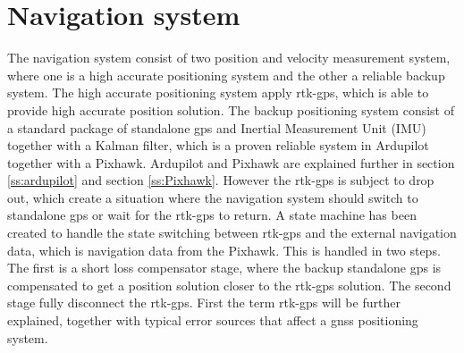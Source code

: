 \section{Navigation system}
The navigation system consist of two position and velocity measurement system, where one is a high accurate positioning system and the other a reliable backup system. The high accurate positioning system apply \gls{rtk-gps}, which is able to provide high accurate position solution. The backup positioning system consist of a standard package of standalone \gls{gps} and Inertial Measurement Unit (IMU) together with a Kalman filter, which is a proven reliable system in Ardupilot together with a Pixhawk. Ardupilot and Pixhawk are explained further in section \ref{ss:ardupilot} and section \ref{ss:Pixhawk}. However the \gls{rtk-gps} is subject to drop out, which create a situation where the navigation system should switch to standalone \gls{gps} or wait for the \gls{rtk-gps} to return. A state machine has been created to handle the state switching between \gls{rtk-gps} and the external navigation data, which is navigation data from the Pixhawk. This is handled in two steps. The first is a short loss compensator stage, where the backup standalone \gls{gps} is compensated to get a position solution closer to the \gls{rtk-gps} solution. The second stage fully disconnect the \gls{rtk-gps}. First the term \gls{rtk-gps} will be further explained, together with typical error sources that affect a \gls{gnss} positioning system.
